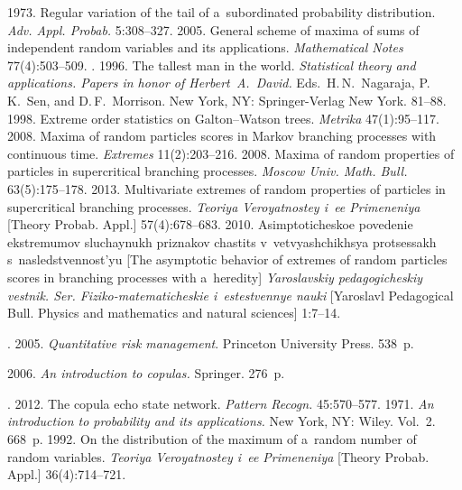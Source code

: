 \begin{multicols}{2}
{{\begin{thebibliography}{99}
 1973. Regular variation of the tail of
a~subordinated probability distribution.
\textit{Adv. Appl. Probab.} 5:308--327.
 2005. General scheme of maxima of sums of independent
random variables and its applications.
\textit{Mathematical Notes} 77(4):503--509.
. 1996. The tallest man in the world.
\textit{Statistical theory and applications. Papers in honor of Herbert~A.~David.}
Eds.\ H.\,N.~Nagaraja, P.\,K.~Sen, and D.\,F.~Morrison.
New York, NY: Springer-Verlag New York. 81--88.
 1998. Extreme order statistics on Galton--Watson trees.
\textit{Metrika} 47(1):95--117.
 2008. Maxima of random particles scores in Markov
branching processes with continuous time. \textit{Extremes} 11(2):203--216.
  2008. Maxima of random properties of particles in supercritical branching processes.
\textit{Moscow Univ. Math. Bull.} 63(5):175--178.
 2013.
Multivariate extremes of random properties of particles in supercritical branching
processes.
\textit{Teoriya Veroyatnostey i~ee Primeneniya} [Theory Probab. Appl.] 57(4):678--683.
 2010. Asimptoticheskoe povedenie eks\-tre\-mu\-mov slu\-chay\-nukh
priz\-na\-kov chastits v~vet\-vya\-shchikh\-sya protsessakh s~nasledstvennost'yu
[The asymptotic behavior of extremes of
random particles scores in branching processes with a~heredity]
\textit{Yaroslavskiy pedagogicheskiy
vestnik. Ser. Fiziko-matematicheskie i~estestvennye nauki}
[Yaroslavl Pedagogical Bull. Physics
and mathematics and natural sciences] 1:7--14. 

. 2005.
\textit{Quantitative risk management}. Princeton University Press. 538~p.

 2006. \textit{An introduction to copulas.} Springer. 276~p.

. 2012.
The copula echo state network. \textit{Pattern Recogn.} 45:570--577.
 1971. \textit{An introduction to probability and its applications.}
 New York, NY: Wiley. Vol.~2. 668~p.
 1992. On the distribution of the maximum of
a~random number of random variables.
\textit{Teoriya Veroyatnostey i~ee Primeneniya} [Theory Probab. Appl.]
36(4):714--721.
\end{thebibliography}

 }
 }

\end{multicols}

